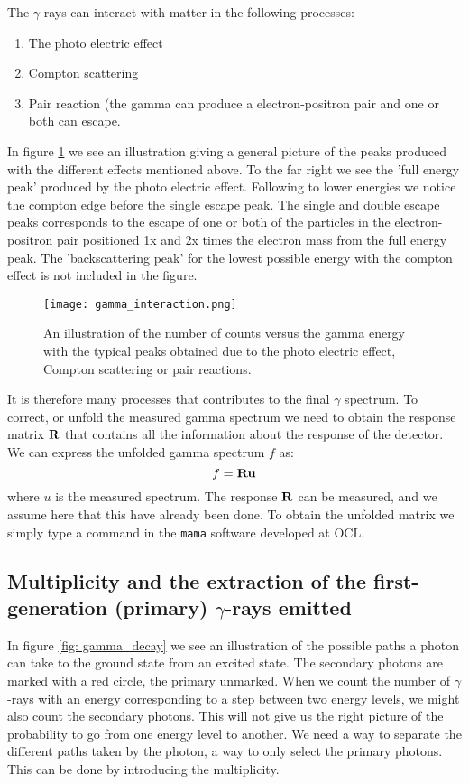 \documentclass[11pt,a4wide]{article}
\begin{document}
The $\gamma$-rays can interact with matter in the following processes:
\begin{enumerate}
\item The photo electric effect
\item Compton scattering
\item Pair reaction (the gamma can produce a electron-positron pair and one or both can escape. 
\end{enumerate}

In figure \ref{fig: gamma_interaction} we see an illustration giving a general picture of the peaks produced with the different effects mentioned above. To the far right we see the 'full energy peak' produced by the photo electric effect. Following to lower energies we notice the compton edge before the single escape peak. The single and double escape peaks corresponds to the escape of one or both of the particles in the electron-positron pair positioned 1x and 2x times the electron mass from the full energy peak. The 'backscattering peak' for the lowest possible energy with the compton effect is not included in the figure.

\begin{figure}[htp]
\centering
\texttt{[image: gamma\_interaction.png]}
\caption{An illustration of the number of counts versus the gamma energy with the typical peaks obtained due to the photo electric effect, Compton scattering or pair reactions. }
\label{fig: gamma_interaction}
\end{figure}

It is therefore many processes that contributes to the final $\gamma$ spectrum. To correct, or unfold the measured gamma spectrum we need to obtain the response matrix $\bf R$ that contains all the information about the response of the detector. We can express the unfolded gamma spectrum $f$ as:
\[
f = \bf{R} u
\]
where $u$ is the measured spectrum. The response $\bf R$ can be measured, and we assume here that this have already been done. To obtain the unfolded matrix we simply type a command in the \texttt{mama} software developed at OCL. 


\subsection{Multiplicity and the extraction of the first-generation (primary) $\gamma$-rays emitted}
In figure \ref{fig: gamma_decay} we see an illustration of the possible paths a photon can take to the ground state from an excited state. The secondary photons are marked with a red circle, the primary unmarked. When we count the number of $\gamma$-rays with an energy corresponding to a step between two energy levels, we might also count the secondary photons. This will not give us the right picture of the probability to go from one energy level to another. We need a way to separate the different paths taken by the photon, a way to only select the primary photons. This can be done by introducing the multiplicity. 
\end{document}
